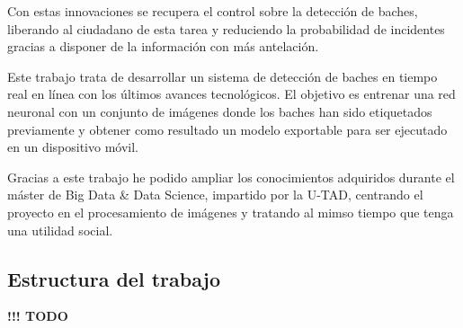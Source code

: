 Con estas innovaciones se recupera el control sobre la detección de baches, liberando al ciudadano de esta tarea y reduciendo la probabilidad de incidentes gracias a disponer de la información con más antelación.

Este trabajo trata de desarrollar un sistema de detección de baches en tiempo real en línea con los últimos avances tecnológicos. El objetivo es entrenar una red neuronal con un conjunto de imágenes donde los baches han sido etiquetados previamente y obtener como resultado un modelo exportable para ser ejecutado en un dispositivo móvil.

Gracias a este trabajo he podido ampliar los conocimientos adquiridos durante el máster de Big Data \& Data Science, impartido por la U-TAD, centrando el proyecto en el procesamiento de imágenes y tratando al mimso tiempo que tenga una utilidad social.


\subsection{Estructura del trabajo}


{\color{red} \textbf{!!! TODO}}